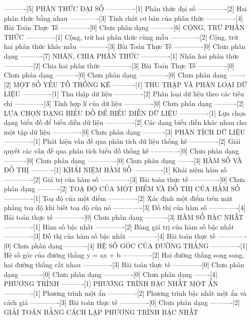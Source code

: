----------[5] PHÂN THỨC ĐẠI SỐ
-------------[1] Phân thức đại số
-------------[2] Hai phân thức bằng nhau
-------------[3] Tính chất cơ bản của phân thức
-------------[4] Bài Toán Thực Tế
-------------[0] Chưa phân dạng
----------[6] CỘNG, TRỪ PHÂN THỨC
-------------[1] Cộng, trừ hai phân thức cùng mẫu
-------------[2] Cộng, trừ hai phân thức khác mẫu
-------------[3] Bài Toán Thực Tế
-------------[0] Chưa phân dạng
----------[7] NHÂN, CHIA PHÂN THỨC
-------------[1] Nhân hai phân thức
-------------[2] Chia hai phân thức
-------------[3] Bài Toán Thực Tế
-------------[0] Chưa phân dạng
----------[0] Chưa phân dạng
-------------[0] Chưa phân dạng
-------[2] MỘT SỐ YẾU TỐ THỐNG KÊ
----------[1] THU THẬP VÀ PHÂN LOẠI DỮ LIỆU
-------------[1] Thu thập dữ liệu
-------------[2] Phân loại dữ liệu theo các tiêu chí
-------------[3] Tính hợp lí của dữ liệu
-------------[0] Chưa phân dạng
----------[2] LỰA CHỌN DẠNG BIỂU ĐỒ ĐỂ BIỂU DIỄN DỮ LIỆU
-------------[1] Lựa chọn dạng biểu đồ để biểu diễn dữ liệu
-------------[2] Các dạng biểu diễn khác nhau cho một tập dữ liệu
-------------[0] Chưa phân dạng
----------[3] PHÂN TÍCH DỮ LIỆU
-------------[1] Phát hiện vấn đề qua phân tích dữ liệu thống kê
-------------[2] Giải quyết các vấn đề qua phân tích biểu đồ thống kê
-------------[0] Chưa phân dạng
----------[0] Chưa phân dạng
-------------[0] Chưa phân dạng
-------[3] HÀM SỐ VÀ ĐỒ THỊ
----------[1] KHÁI NIỆM HÀM SỐ
-------------[1] Khái niệm hàm số
-------------[2] Giá trị của hàm số
-------------[3] Bài toán thực tế
-------------[0] Chưa phân dạng
----------[2] TOẠ ĐỘ CỦA MỘT ĐIỂM VÀ ĐỒ THỊ CỦA HÀM SỐ
-------------[1] Toạ độ của một điểm
-------------[2] Xác định một điểm trên mặt phẳng toạ độ khi biết toạ độ của nó
-------------[3] Đồ thị của hàm số
-------------[4] Bài toán thực tế
-------------[0] Chưa phân dạng
----------[3] HÀM SỐ BẬC NHẤT
-------------[1] Hàm số bậc nhất
-------------[2] Bảng giá trị của hàm số bậc nhất
-------------[3] Đồ thị của hàm số bậc nhất
-------------[4] Bài toán thực tế
-------------[0] Chưa phân dạng
----------[4] HỆ SỐ GÓC CỦA ĐƯỜNG THẲNG
-------------[1] Hệ số góc của đường thẳng y = ax + b
-------------[2] Hai đường thẳng song song, hai đường thẳng cắt nhau
-------------[3] Bài toán thực tế
-------------[0] Chưa phân dạng
----------[0] Chưa phân dạng
-------------[0] Chưa phân dạng
-------[4] PHƯƠNG TRÌNH
----------[1] PHƯƠNG TRÌNH BẬC NHẤT MỘT ẨN
-------------[1] Phương trình một ẩn
-------------[2] Phương trình bậc nhất một ẩn và cách giả
-------------[3] Bài toán thực tế
-------------[0] Chưa phân dạng
----------[2] GIẢI TOÁN BẰNG CÁCH LẬP PHƯƠNG TRÌNH BẬC NHẤT
